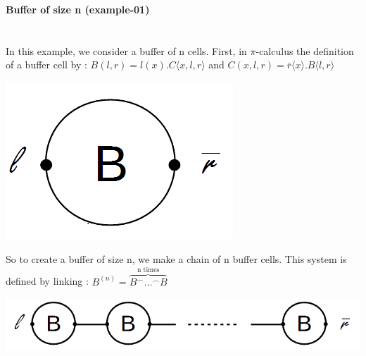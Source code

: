 \documentclass[11pt]{report}
\begin{document}
\vspace*{15pt}
{}
\tabto{0cm} {\LARGE \textbf{Buffer of size n (example-01)}}
\vspace*{3pt}
\vspace*{10pt}
\\
 \\ \\
In this example, we consider a buffer of n cells. First, in $\pi$-calculus the definition of a buffer cell by :
$B(l,r) = l(x).C \langle x,l,r \rangle$ and $C(x,l,r) = \bar{r} \langle x \rangle .B \langle l,r \rangle$
\vspace*{3pt}
\vspace*{10pt}
\begin{center}
\includegraphics[scale = 0.5]{BufferCell.png}
\end{center}
So to create a buffer of size n, we make a chain of n buffer cells. This system is defined by linking :
$B^{(n)} = \overbrace{B^{ \frown} \ldots ^{\frown} B}^{\text{n times}}$
\vspace*{3pt}
\vspace*{10pt}
\begin{center}
\includegraphics[scale = 0.6]{Buffern.png}
\end{center}
\end{document}
